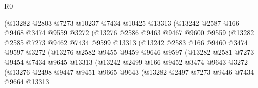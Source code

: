 \begin{lexlean}{R0}
\begin{coremodule}
                      (@13282
                        @2803
                        @7273
                        @10237
                        @7434
                        @10425
                        @13313
                        (@13242
                          @2587
                          @166
                          @9468
                          @3474
                          @9559
                          @3272
                          (@13276
                            @2586
                            @9463
                            @9467
                            @9600
                            @9559
                            (@13282
                              @2585
                              @7273
                              @9462
                              @7434
                              @9599
                              @13313
                              (@13242
                                @2583
                                @166
                                @9460
                                @3474
                                @9597
                                @3272
                                (@13276
                                  @2582
                                  @9455
                                  @9459
                                  @9646
                                  @9597
                                  (@13282
                                    @2581
                                    @7273
                                    @9454
                                    @7434
                                    @9645
                                    @13313
                                    (@13242
                                      @2499
                                      @166
                                      @9452
                                      @3474
                                      @9643
                                      @3272
                                      (@13276
                                        @2498
                                        @9447
                                        @9451
                                        @9665
                                        @9643
                                        (@13282
                                          @2497
                                          @7273
                                          @9446
                                          @7434
                                          @9664
                                          @13313

\end{coremodule}
\end{lexlean}
